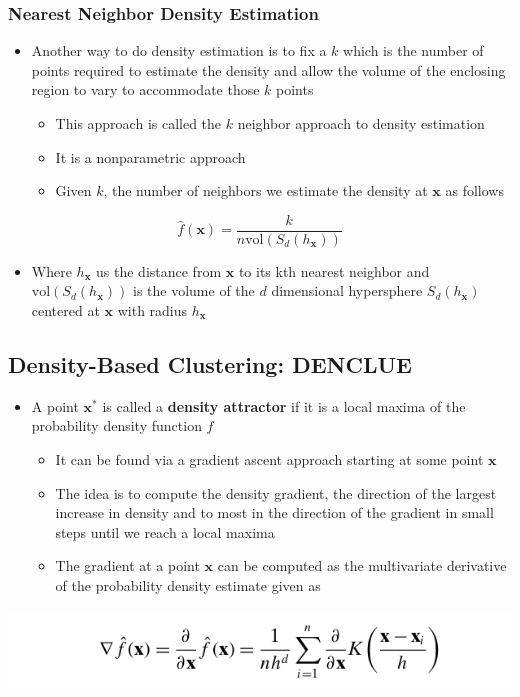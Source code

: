 \documentclass[11pt]{article}
\begin{document}
\subsubsection{Nearest Neighbor Density Estimation}
\label{sec:org7ab2535}
\begin{itemize}
\item Another way to do density estimation is to fix a \(k\) which is the number of points required to estimate the density and allow the volume of the enclosing region to vary to accommodate those \(k\) points
\begin{itemize}
\item This approach is called the \(k\) neighbor approach to density estimation
\item It is a nonparametric approach
\item Given \(k\), the number of neighbors we estimate the density at \(\pmb x\) as follows
\end{itemize}
\end{itemize}
\begin{equation}
  \hat f (\pmb x) = \frac{k}{n \text{vol}(S_d(h_{\pmb x}))}
\end{equation}
\begin{itemize}
\item Where \(h_{\pmb x}\)  us the distance from \(\pmb x\) to its kth nearest neighbor and \(\text{vol}(S_d(h_{\pmb x}))\) is the volume of the \(d\) dimensional hypersphere \(S_d(h_{\pmb x})\) centered at \(\pmb x\) with radius \(h_{\pmb x}\)
\end{itemize}

\subsection{Density-Based Clustering: DENCLUE}
\label{sec:org43dcf53}
\begin{itemize}
\item A point \(\pmb x^*\) is called a \textbf{density attractor} if it is a local maxima of the probability density function \(f\)
\begin{itemize}
\item It can be found via a gradient ascent approach starting at some point \(\pmb x\)
\item The idea is to compute the density gradient, the direction of the largest increase in density and to most in the direction of the gradient in small steps until we reach a local maxima
\item The gradient at a point \(\pmb x\) can be computed as the multivariate derivative of the probability density estimate given as
\end{itemize}
\end{itemize}
\begin{center}
\includegraphics[width=.9\linewidth]{Density-based Clustering/screenshot_2018-12-01_13-21-25.png}
\end{center}
\end{document}
